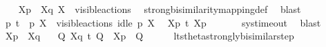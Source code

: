 \begin{isabellebody}
\ \ \isamarkupfalse%
\ {\isacartoucheopen}{\isasymtheta}{\isacharbrackleft}{\kern0pt}X{\isacharbrackright}{\kern0pt}{\isacharparenleft}{\kern0pt}p{\isacharparenright}{\kern0pt}\ {\isasymleftrightarrow}\ {\isasymtheta}{\isacharbrackleft}{\kern0pt}X{\isacharbrackright}{\kern0pt}{\isacharparenleft}{\kern0pt}q{\isacharparenright}{\kern0pt}{\isacartoucheclose}\ {\isacartoucheopen}X\ {\isasymsubseteq}\ visible{\isacharunderscore}{\kern0pt}actions{\isacartoucheclose}\ \isamarkupfalse%
\ strong{\isacharunderscore}{\kern0pt}bisimilarity{\isacharunderscore}{\kern0pt}mapping{\isacharunderscore}{\kern0pt}def\ \isamarkupfalse%
\ blast{\isacharplus}{\kern0pt}\isanewline
\ \ \isamarkupfalse%
\ {\isacartoucheopen}p\ {\isasymlongmapsto}t\ \ p{\isacharprime}{\kern0pt}{\isacartoucheclose}\ {\isacartoucheopen}X\ {\isasymsubseteq}\ visible{\isacharunderscore}{\kern0pt}actions{\isacartoucheclose}\ {\isacartoucheopen}idle\ p\ X{\isacartoucheclose}\ \isamarkupfalse%
\ {\isacartoucheopen}{\isasymtheta}{\isacharbrackleft}{\kern0pt}X{\isacharbrackright}{\kern0pt}{\isacharparenleft}{\kern0pt}p{\isacharparenright}{\kern0pt}\ {\isasymlongmapsto}\isactrlsup {\isasymtheta}t\ {\isasymtheta}{\isacharbrackleft}{\kern0pt}X{\isacharbrackright}{\kern0pt}{\isacharparenleft}{\kern0pt}p{\isacharprime}{\kern0pt}{\isacharparenright}{\kern0pt}{\isacartoucheclose}\ \isanewline
\ \ \ \ \isamarkupfalse%
\ sys{\isacharunderscore}{\kern0pt}timeout\ \isamarkupfalse%
\ blast\isanewline
\ \ \isamarkupfalse%
\ {\isacartoucheopen}{\isasymtheta}{\isacharbrackleft}{\kern0pt}X{\isacharbrackright}{\kern0pt}{\isacharparenleft}{\kern0pt}p{\isacharparenright}{\kern0pt}\ {\isasymleftrightarrow}\ {\isasymtheta}{\isacharbrackleft}{\kern0pt}X{\isacharbrackright}{\kern0pt}{\isacharparenleft}{\kern0pt}q{\isacharparenright}{\kern0pt}{\isacartoucheclose}\ \isamarkupfalse%
\ {\isacartoucheopen}{\isasymexists}\ Q{\isacharprime}{\kern0pt}{\isachardot}{\kern0pt}\ {\isasymtheta}{\isacharbrackleft}{\kern0pt}X{\isacharbrackright}{\kern0pt}{\isacharparenleft}{\kern0pt}q{\isacharparenright}{\kern0pt}\ {\isasymlongmapsto}\isactrlsup {\isasymtheta}t\ Q{\isacharprime}{\kern0pt}\ {\isasymand}\ {\isasymtheta}{\isacharbrackleft}{\kern0pt}X{\isacharbrackright}{\kern0pt}{\isacharparenleft}{\kern0pt}p{\isacharprime}{\kern0pt}{\isacharparenright}{\kern0pt}\ {\isasymleftrightarrow}\ Q{\isacharprime}{\kern0pt}{\isacartoucheclose}\isanewline
\ \ \ \ \isamarkupfalse%
\ lts{\isacharunderscore}{\kern0pt}theta{\isachardot}{\kern0pt}strongly{\isacharunderscore}{\kern0pt}bisimilar{\isacharunderscore}{\kern0pt}step{\isacharparenleft}{\kern0pt}{}{\isacharparenright}{\kern0pt}\ \isamarkupfalse%

\end{isabellebody}
